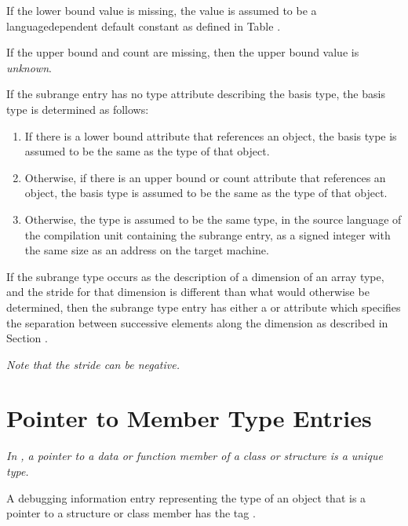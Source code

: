 If the lower bound value is missing, the value is assumed to
be a language\dash dependent default constant as defined in
Table .

If the upper bound and count are missing, then the upper bound value is 
\textit{unknown}.

If the subrange entry has no type attribute describing the
basis type, the basis type is determined as follows:
\begin{enumerate}[1. ]
\item
If there is a lower bound attribute that references an object,
the basis type is assumed to be the same as the type of that object.
\item
Otherwise, if there is an upper bound or count attribute that references
an object, the basis type is assumed to be the same as the type of that object.
\item
Otherwise, the type is
assumed to be the same type, in the source language of the
compilation unit containing the subrange entry, as a signed
integer with the same size as an address on the target machine.
\end{enumerate}

If the subrange type occurs as the description of a dimension
of an array type, and the stride for that dimension is
\hypertarget{chap:DWATbytestridesubrangestridedimensionofarraytype}{}
different than what would otherwise be determined, then
\hypertarget{chap:DWATbitstridesubrangestridedimensionofarraytype}{}
the subrange type entry has either 
a 
\DWATbytestride{} or
\DWATbitstride{} attribute 
which specifies the separation
between successive elements along the dimension as described
in 
Section .

\textit{Note that the stride can be negative.}

\section{Pointer to Member Type Entries}
\label{chap:pointertomembertypeentries}

\textit{In , a 
pointer to a data or function member of a class or
structure is a unique type.}

A debugging information entry representing the type of an
object that is a pointer to a structure or class member has
the tag \DWTAGptrtomembertypeTARG.

